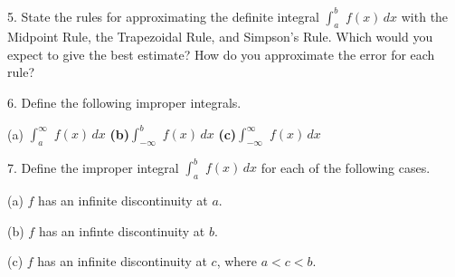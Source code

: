 \documentclass{sebase}
\begin{document}
\begin{multicols}{2}
\begin{ExerciseList}
\item[\hfill 5.] State the rules for approximating the definite integral 
\newline
$\int_{a}^{b}\,\,f\left( x\right) \,dx$ with the Midpoint Rule, the
Trapezoidal Rule, and Simpson's Rule. Which would you expect to give the
best estimate? How do you approximate the error for each rule?

%

\item[\hfill 6.] Define the following improper integrals.

\begin{ExerciseList}
\item[(a)] $\int_{a}^{\infty }\,\,f\left( x\right) \,dx$\hspace{12pt}\textbf{%
(b)}\hspace{3pt}$\int_{-\infty }^{b}\,\,f\left( x\right) \,dx$\hspace{12pt}%
\textbf{(c)}\hspace{3pt}$\int_{-\infty }^{\infty }\,\,f\left( x\right) \,dx$
\end{ExerciseList}

%

\item[\hfill 7.] Define the improper integral $\int_{a}^{b}\,\,f\left(
x\right) \,dx$ for each of the following cases.

\begin{ExerciseList}
\item[(a)] $f$ has an infinite discontinuity at $a$.

\item[(b)] $f$ has an infinte discontinuity at $b$.

\item[(c)] $f$ has an infinite discontinuity at $c$, where $a<c<b$.
\end{ExerciseList}

%


\end{ExerciseList}
\end{multicols}
\end{document}
